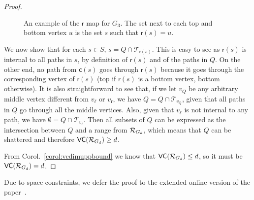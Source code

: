\begin{proof}
  \begin{figure}[ht]
    \centering
    \caption{An example of the $\mathsf{r}$ map for $G_3$. The set next to
    each top and bottom vertex $u$ is the set $s$ such that $\mathsf{r}(s)=u$.}
    \label{fig:mapexample}
  \end{figure}
  
  We now show that for each $s\in S$, $s=Q\cap\mathcal{T}_{\mathsf{r}(s)}$. This
  is easy to see as $\mathsf{r}(s)$ is internal to all paths in $s$, by
  definition of $\mathsf{r}(s)$ and of the paths in $Q$. On the other end, no
  path from $\mathsf{c}(s)$ goes through $\mathsf{r}(s)$ because it goes through
  the corresponding vertex of $\mathsf{r}(s)$ (top if $\mathsf{r}(s)$ is a
  bottom vertex, bottom otherwise). It is also straightforward to see that,
  if we let $v_Q$ be any arbitrary middle vertex different from $v_\ell$
  or $v_\mathrm{r}$, we have $Q=Q\cap\mathcal{T}_{v_Q}$, given that all paths in
  $Q$ go through all the middle vertices. Also, given that $v_\ell$ is not
  internal to any path, we have $\emptyset=Q\cap\mathcal{T}_{v_\ell}$. Then all
  subsets of $Q$ can be expressed as the intersection between $Q$ and a range
  from $\mathcal{R}_{G_d}$, which means that $Q$ can be shattered and therefore
  $\mathsf{VC}(\mathcal{R}_{G_d})\ge d$.

  From Corol.~\ref{corol:vcdimuppbound} we know that $\mathsf{VC}(\mathcal{R}_{G_d})\le d$, so
  it must be $\mathsf{VC}(\mathcal{R}_{G_d})=d$.
\end{proof}
\else
Due to space constraints, we defer the proof to the extended online version of
the paper~\citep{RiondatoK13}.
\fi

